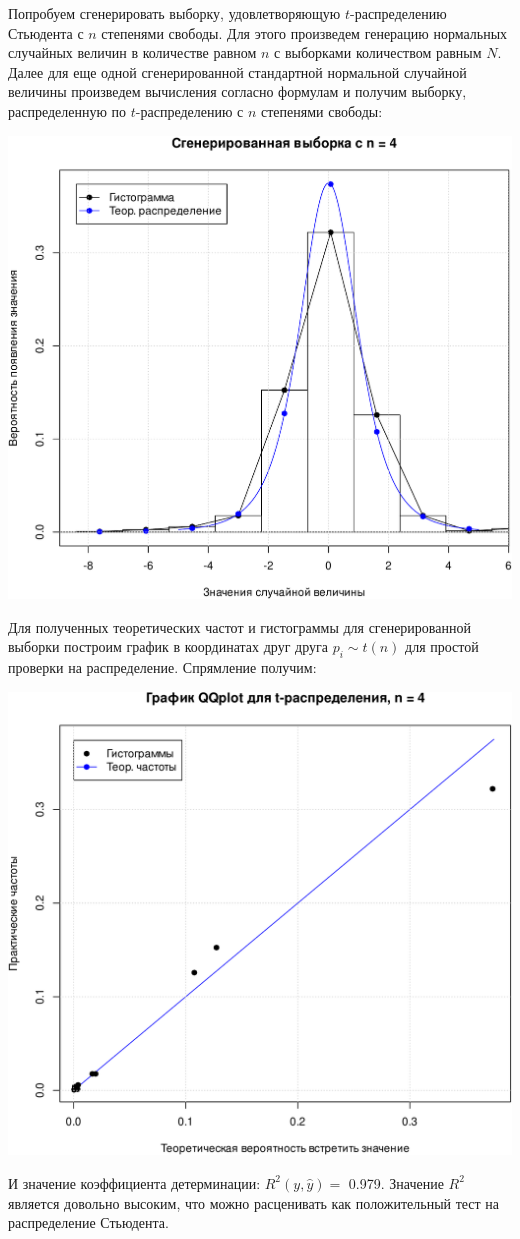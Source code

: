\documentclass[
]{article}
\begin{document}
Попробуем сгенерировать выборку, удовлетворяющую \(t\)-распределению
Стьюдента с \(n\) степенями свободы. Для этого произведем генерацию
нормальных случайных величин в количестве равном \(n\) с выборками
количеством равным \(N\). Далее для еще одной сгенерированной
стандартной нормальной случайной величины произведем вычисления согласно
формулам и получим выборку, распределенную по \(t\)-распределению с
\(n\) степенями свободы:

\begin{center}\includegraphics[width=0.6\linewidth]{Prac4_files/figure-latex/unnamed-chunk-10-1} \end{center}

Для полученных теоретических частот и гистограммы для сгенерированной
выборки построим график в координатах друг друга \(p_i \sim t(n)\) для
простой проверки на распределение. Спрямление получим:

\begin{center}\includegraphics[width=0.6\linewidth]{Prac4_files/figure-latex/unnamed-chunk-11-1} \end{center}

И значение коэффициента детерминации: \(R^2(y, \hat{y}) =\) 0.979.
Значение \(R^2\) является довольно высоким, что можно расценивать как
положительный тест на распределение Стьюдента.
\end{document}
